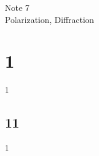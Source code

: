 \documentclass[12pt]{article}
\begin{document}
\normalfont
\pagestyle{pages}


\begin{center}
\vspace{3in}
{\Large Note 7 } \\[0.05in]
Polarization, Diffraction \\ [0.5in]
\end{center}


\section{1}
1

\subsection{11}

1
\end{document}
